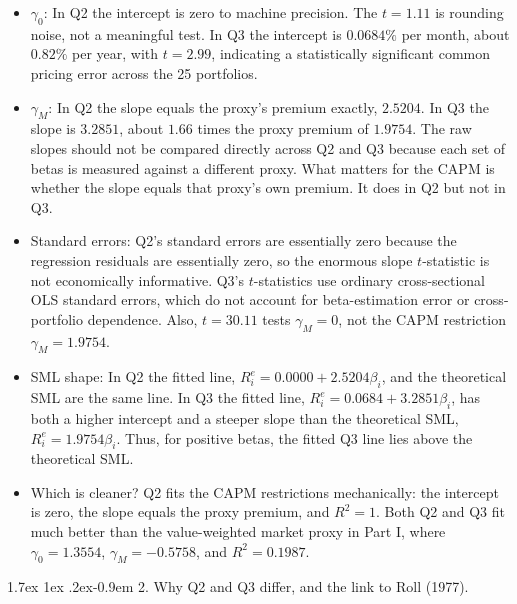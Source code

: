 \documentclass[11pt]{article}
\makeatletter
\renewcommand\paragraph{\@startsection{paragraph}{4}{0pt}%
  {1.7ex \@plus 1ex \@minus .2ex}{-0.9em}%
  {\normalfont\bfseries\normalsize\color{psink}}}
\newenvironment{tight}
  {\begin{itemize}\setlength{\itemsep}{3pt}\setlength{\parskip}{0pt}%
   \setlength{\topsep}{3pt}\setlength{\leftmargini}{1.4em}}
  {\end{itemize}}
\makeatother
\begin{document}
\begin{tight}
\item $\gamma_0$: In Q2 the intercept is zero to machine precision. The
$t = 1.11$ is rounding noise, not a meaningful test. In Q3 the intercept is
$0.0684\%$ per month, about $0.82\%$ per year, with $t = 2.99$, indicating a
statistically significant common pricing error across the 25 portfolios.

\item $\gamma_M$: In Q2 the slope equals the proxy's premium exactly,
$2.5204$. In Q3 the slope is $3.2851$, about $1.66$ times the proxy premium of
$1.9754$. The raw slopes should not be compared directly across Q2 and Q3
because each set of betas is measured against a different proxy. What matters
for the CAPM is whether the slope equals that proxy's own premium. It does in
Q2 but not in Q3.

\item Standard errors: Q2's standard errors are essentially zero because the
regression residuals are essentially zero, so the enormous slope $t$-statistic
is not economically informative. Q3's $t$-statistics use ordinary
cross-sectional OLS standard errors, which do not account for beta-estimation
error or cross-portfolio dependence. Also, $t = 30.11$ tests $\gamma_M = 0$,
not the CAPM restriction $\gamma_M = 1.9754$.

\item SML shape: In Q2 the fitted line,
$R^e_i = 0.0000 + 2.5204\beta_i$,
and the theoretical SML are the same line. In Q3 the fitted line,
$R^e_i = 0.0684 + 3.2851\beta_i$,
has both a higher intercept and a steeper slope than the theoretical SML,
$R^e_i = 1.9754\beta_i$. Thus, for positive betas, the fitted Q3 line lies
above the theoretical SML.

\item Which is cleaner? Q2 fits the CAPM restrictions mechanically: the
intercept is zero, the slope equals the proxy premium, and $R^2 = 1$. Both Q2
and Q3 fit much better than the value-weighted market proxy in Part I, where
$\gamma_0 = 1.3554$, $\gamma_M = -0.5758$, and $R^2 = 0.1987$.
\end{tight}

\paragraph{2. Why Q2 and Q3 differ, and the link to Roll (1977).}
\end{document}
